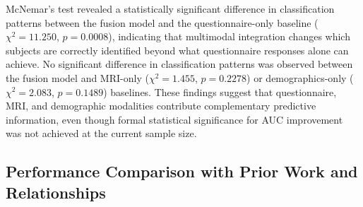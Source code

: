 \documentclass[10pt,letterpaper]{article}
\begin{document}
                                                                                                                          McNemar's test revealed a statistically significant difference in
                                                                                                                          classification patterns between the fusion model and the
                                                                                                                          questionnaire-only baseline ($\chi^2 = 11.250$, $p = 0.0008$),
                                                                                                                          indicating that multimodal integration changes which subjects are
                                                                                                                          correctly identified beyond what questionnaire responses alone can
                                                                                                                          achieve. No significant difference in classification patterns was
                                                                                                                          observed between the fusion model and MRI-only ($\chi^2 = 1.455$,
                                                                                                                          $p = 0.2278$) or demographics-only ($\chi^2 = 2.083$, $p = 0.1489$)
                                                                                                                          baselines. These findings suggest that questionnaire, MRI, and
                                                                                                                          demographic modalities contribute complementary predictive information,
                                                                                                                          even though formal statistical significance for AUC improvement was
                                                                                                                          not achieved at the current sample size.

                                                                                                                          \subsection*{Performance Comparison with Prior Work and Relationships}
\end{document}
